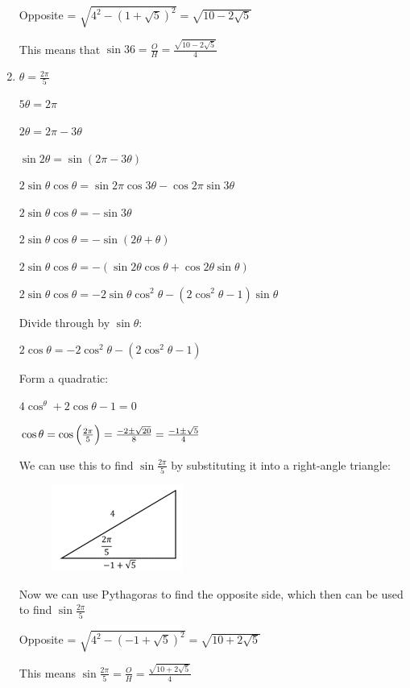 \documentclass[../main.tex]{subfiles}
\begin{document}
\begin{enumerate}[itemsep=0.4cm]
    Opposite = $\sqrt{4^2-(1+\sqrt{5})^2}=\sqrt{10-2\sqrt{5}}$

    This means that $\sin{36}=\frac{O}{H}=\frac{\sqrt{10-2\sqrt{5}}}{4}$

    \item 
    $\theta=\frac{2\pi}{5}$

    $5\theta=2\pi$

    $2\theta=2\pi - 3\theta$

    $\sin{2\theta}=\sin{(2\pi-3\theta)}$

    $2\sin{\theta}\cos{\theta}=\sin{2\pi}\cos{3\theta}-\cos{2\pi}\sin{3\theta}$

    $2\sin{\theta}\cos{\theta}=-\sin{3\theta}$

    $2\sin{\theta}\cos{\theta}=-\sin{(2\theta+\theta)}$

    $2\sin{\theta}\cos{\theta}=-(\sin{2\theta}\cos{\theta}+\cos{2\theta}\sin{\theta})$

    $2\sin{\theta}\cos{\theta}=-2\sin{\theta}\cos^2{\theta}-(2\cos^2{\theta}-1)\sin{\theta}$

    Divide through by $\sin{\theta}$:

    $2\cos{\theta}=-2\cos^2{\theta}-(2\cos^2{\theta}-1)$

    Form a quadratic:

    $4\cos^{\theta}+2\cos{\theta}-1=0$

    $\cos{\theta}=\cos{\Bigl(\frac{2\pi}{5}\Bigr)}=\frac{-2\pm \sqrt{20}}{8}=\frac{-1\pm \sqrt{5}}{4}$

    We can use this to find $\sin{\frac{2\pi}{5}}$ by substituting it into a right-angle triangle:

    \begin{figure}[h]
        \centering
        \includegraphics[width=0.2\linewidth]{images/exacttrigvalues2.png}
    \end{figure}

    Now we can use Pythagoras to find the opposite side, which then can be used to find $\sin{\frac{2\pi}{5}}$

    Opposite = $\sqrt{4^2-(-1+\sqrt{5})^2}=\sqrt{10+2\sqrt{5}}$

    This means $\sin{\frac{2\pi}{5}}=\frac{O}{H}=\frac{\sqrt{10+2\sqrt{5}}}{4}$
\end{enumerate}
\end{document}

